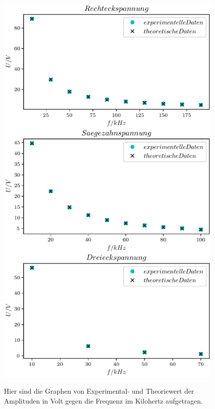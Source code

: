 \begin{figure}
  \includegraphics[width=\textwidth, height=20cm]{plot1.pdf}
  \label{fig:plot1}
\caption{Hier sind die Graphen von Experimental- und Theoriewert der Amplituden in Volt gegen die Frequenz im Kilohertz aufgetragen.}
\end{figure}



